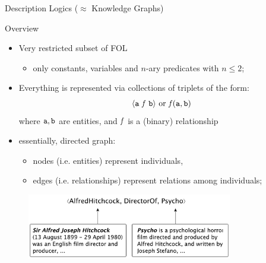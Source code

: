 \documentclass[presentation]{beamer}\mode<presentation>{\usetheme{AMSBolognaFC}}
\begin{document}
\begin{frame}[allowframebreaks]{Description Logics ($\approx$ Knowledge Graphs)}
    
    \begin{block}{Overview}
        \begin{itemize}
            \item Very restricted subset of FOL
            \begin{itemize}
                \item only constants, variables and $n$-ary predicates with $n \leq 2$;
            \end{itemize}

            \medskip
    
            \item Everything is represented via \alert{collections of triplets} of the form:
            \[\langle \mathtt{a}\ \mathit{f}\ \mathtt{b} \rangle \text{ or } \mathit{f}(\mathtt{a}, \mathtt{b})\]
            where $\mathtt{a}, \mathtt{b}$ are \alert{entities}, and $\mathit{f}$ is a (binary) \alert{relationship}

            \medskip
            
            \item essentially, directed graph:
            \begin{itemize}
                \item nodes (i.e. entities) represent \alert{individuals},
                \item edges (i.e. relationships) represent \alert{relations} among individuals;
            \end{itemize}
        \end{itemize}
    \end{block}
    
    \framebreak
    
    \begin{figure}
        \centering
        \includegraphics[width=0.8\textwidth]{figures/kg-example}
    \end{figure}    
\end{frame}    
    
\end{document}
